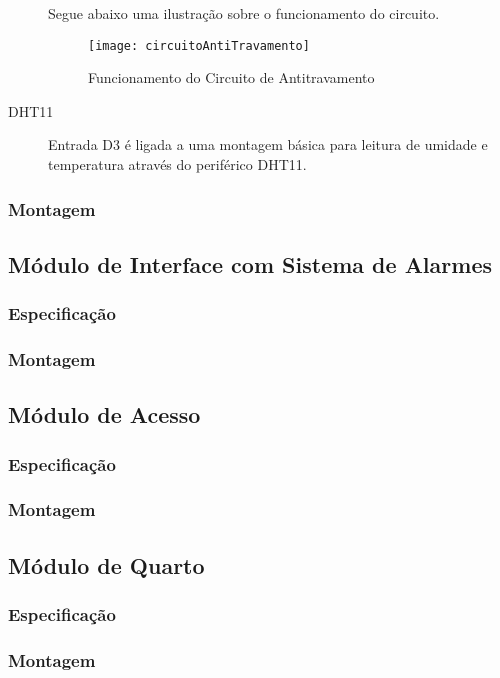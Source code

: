 \begin{description}
Segue abaixo uma ilustração sobre o funcionamento do circuito.

\begin{figure}[H]
	\centering
	\caption{Funcionamento do Circuito de Antitravamento}
  \texttt{[image: circuitoAntiTravamento]}
\label{fig:circuitoAntiTravamento}
\end{figure}

\item [DHT11] Entrada D3 é ligada a uma montagem básica para leitura de umidade e temperatura através do periférico DHT11.

\end{description}

\subsubsection{Montagem}

\subsection{Módulo de Interface com Sistema de Alarmes}
\subsubsection{Especificação}
\subsubsection{Montagem}

\subsection{Módulo de Acesso}
\subsubsection{Especificação}
\subsubsection{Montagem}

\subsection{Módulo de Quarto}
\subsubsection{Especificação}
\subsubsection{Montagem}

